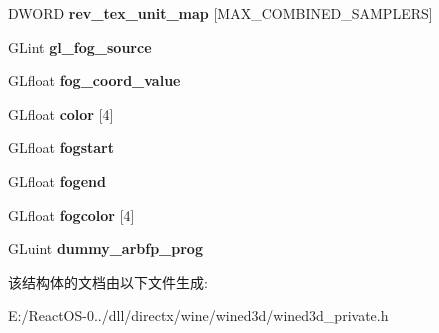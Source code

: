 \begin{DoxyCompactItemize}
$$\item 
\mbox{\label{structwined3d__context_a947ca2ee1ccf358d2ed261371b3f6843}} 
D\+W\+O\+RD {\bfseries rev\+\_\+tex\+\_\+unit\+\_\+map} \mbox{[}M\+A\+X\+\_\+\+C\+O\+M\+B\+I\+N\+E\+D\+\_\+\+S\+A\+M\+P\+L\+E\+RS\mbox{]}
\item 
\mbox{\label{structwined3d__context_a9823645f7aff9787a36788576bfa54a6}} 
G\+Lint {\bfseries gl\+\_\+fog\+\_\+source}
\item 
\mbox{\label{structwined3d__context_a80efa829482d382e4213e0300780ef9a}} 
G\+Lfloat {\bfseries fog\+\_\+coord\+\_\+value}
\item 
\mbox{\label{structwined3d__context_a449d298300ef9a45648f3730206b980e}} 
G\+Lfloat {\bfseries color} \mbox{[}4\mbox{]}
\item 
\mbox{\label{structwined3d__context_aefbfa1bc7cb24351e014e70f86666761}} 
G\+Lfloat {\bfseries fogstart}
\item 
\mbox{\label{structwined3d__context_ae1c82d7a99727a87cc627684ab22ea2c}} 
G\+Lfloat {\bfseries fogend}
\item 
\mbox{\label{structwined3d__context_ad075cbfe845e91af4accc431b122f91d}} 
G\+Lfloat {\bfseries fogcolor} \mbox{[}4\mbox{]}
\item 
\mbox{\label{structwined3d__context_a4a464974ccf2fe4ce0bc117d21d2bc8f}} 
G\+Luint {\bfseries dummy\+\_\+arbfp\+\_\+prog}
\end{DoxyCompactItemize}


该结构体的文档由以下文件生成\+:\begin{DoxyCompactItemize}
\item 
E\+:/\+React\+O\+S-\/0../dll/directx/wine/wined3d/wined3d\+\_\+private.\+h\end{DoxyCompactItemize}
